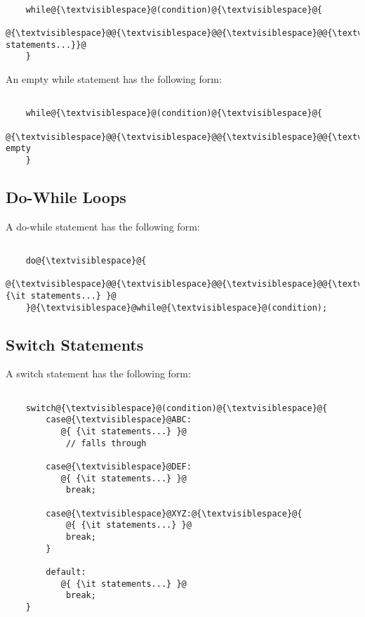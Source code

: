 \documentclass[fleqn,12pt]{PARCOneColumn} %
\begin{document}
\begin{lstlisting}

    while@{\textvisiblespace}@(condition)@{\textvisiblespace}@{
    @{\textvisiblespace}@@{\textvisiblespace}@@{\textvisiblespace}@@{\textvisiblespace}@@{{\it statements...}}@
    }

\end{lstlisting}

An empty while statement has the following form:

\begin{lstlisting}

    while@{\textvisiblespace}@(condition)@{\textvisiblespace}@{
    @{\textvisiblespace}@@{\textvisiblespace}@@{\textvisiblespace}@@{\textvisiblespace}@// empty
    }

\end{lstlisting}

\subsection{Do-While Loops}
A do-while statement has the following form:

\begin{lstlisting}

	do@{\textvisiblespace}@{
	@{\textvisiblespace}@@{\textvisiblespace}@@{\textvisiblespace}@@{\textvisiblespace}@@{ {\it statements...} }@
	}@{\textvisiblespace}@while@{\textvisiblespace}@(condition);

\end{lstlisting}

\subsection{Switch Statements}
A switch statement has the following form:

\begin{lstlisting}

    switch@{\textvisiblespace}@(condition)@{\textvisiblespace}@{
        case@{\textvisiblespace}@ABC:
           @{ {\it statements...} }@
            // falls through

        case@{\textvisiblespace}@DEF:
           @{ {\it statements...} }@
            break;

        case@{\textvisiblespace}@XYZ:@{\textvisiblespace}@{
            @{ {\it statements...} }@
            break;
        }

        default:
           @{ {\it statements...} }@
            break;
    }

\end{lstlisting}
\end{document}
